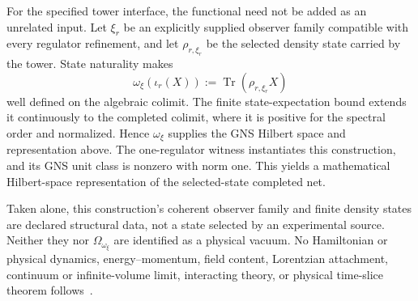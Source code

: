 \documentclass[11pt]{article}
\theoremstyle{remark}
\theoremstyle{plain}
\begin{document}
For the specified tower interface, the functional need not be added as an
unrelated input.  Let \(\xi_r\) be an explicitly supplied observer family
compatible with every regulator refinement, and let \(\rho_{r,\xi_r}\) be
the selected density state carried by the tower.  State naturality
makes
\[
  \omega_\xi(\iota_r(X))
    :=\operatorname{Tr}(\rho_{r,\xi_r}X)
\]
well defined on the algebraic colimit.  The finite state-expectation bound
extends it continuously to the completed colimit, where it is positive for
the spectral order and normalized.  Hence \(\omega_\xi\) supplies the GNS
Hilbert space and representation above. The one-regulator witness
instantiates this construction, and its GNS unit class is nonzero with norm
one. This yields a mathematical Hilbert-space representation of the
selected-state completed net.

Taken alone, this construction's coherent observer family and finite density
states are declared
structural data, not a state selected by an experimental source.  Neither
they nor \(\Omega_{\omega_\xi}\) are identified as a physical vacuum.  No
Hamiltonian or physical dynamics, energy--momentum, field content, Lorentzian
attachment, continuum or infinite-volume limit, interacting theory, or
physical time-slice theorem follows~\cite{ophrepo}.
\end{document}
